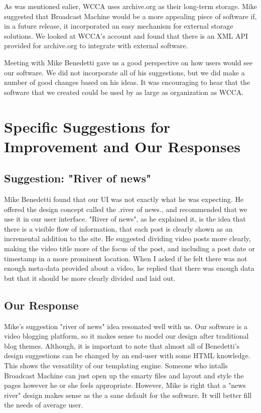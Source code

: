 \documentclass[a4paper,12pt]{report}
\begin{document}
As was mentioned ealier, WCCA uses archive.org as their long-term storage. 
Mike suggested that Broadcast Machine would be a more appealing piece of software if, in a future release, it 
incorporated an easy mechanism for external storage solutions. 
We looked at WCCA's account and found that there is an XML API provided for archive.org to integrate with external 
software. 

Meeting with Mike Benedetti gave us a good perspective on how users would see our software. 
We did not incorporate all of his suggestions, but we did make a number of good changes based on his ideas. 
It was encouraging to hear that the software that we created could be used by as large as organization as WCCA.

\section{Specific Suggestions for Improvement and Our Responses}

\subsection{Suggestion: "River of news"}

Mike Benedetti found that our UI was not exactly what he was expecting. 
He offered the design concept called the .river of news., and recommended that we use it in our user interface. 
"River of news", as he explained it, is the idea that there is a visible flow of information, that each post is clearly 
shown as an incremental addition to the site. 
He suggested dividing video posts more clearly, making the video title more of the focus of the post, and including a 
post date or timestamp in a more prominent location. 
When I asked if he felt there was not enough meta-data provided about a video, he replied that there was enough data but 
that it should be more clearly divided and laid out. 

\subsection{Our Response}

Mike's suggestion "river of news" idea resonated well with us. 
Our software is a video blogging platform, so it makes sense to model our design after traditional blog themes. 
Although, it is important to note that almost all of Benedetti's design suggestions can be changed by an end-user with 
some HTML knowledge. 
This shows the versatility of our templating engine. 
Someone who intalls Broadcast Machine can just open up the smarty files and layout and style the pages however he or she 
feels appropriate. 
However, Mike is right that a "news river" design makes sense as the a sane default for the software. 
It will better fill the needs of average user. 
\end{document}
